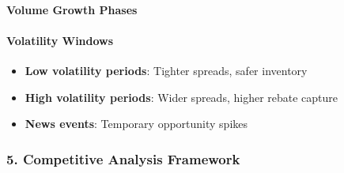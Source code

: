 \hypertarget{volume-growth-phases}{%
\paragraph{\texorpdfstring{\textbf{Volume Growth
Phases}}{Volume Growth Phases}}\label{volume-growth-phases}}

\begin{Shaded}
\begin{Highlighting}[]
    \NormalTok{ token\_data[}\NormalTok{] }\OperatorTok{\textgreater{}} \NormalTok{:  }
           
    \NormalTok{ token\_data[}\NormalTok{] }\OperatorTok{\textless{}} \NormalTok{:  }
           
    \NormalTok{:}
           
\end{Highlighting}
\end{Shaded}

\hypertarget{volatility-windows}{%
\paragraph{\texorpdfstring{\textbf{Volatility
Windows}}{Volatility Windows}}\label{volatility-windows}}

\begin{itemize}
\tightlist
\item
  \textbf{Low volatility periods}: Tighter spreads, safer inventory
\item
  \textbf{High volatility periods}: Wider spreads, higher rebate capture
\item
  \textbf{News events}: Temporary opportunity spikes
\end{itemize}

\hypertarget{competitive-analysis-framework}{%
\subsubsection{\texorpdfstring{5. \textbf{Competitive Analysis
Framework}}{5. Competitive Analysis Framework}}\label{competitive-analysis-framework}}

